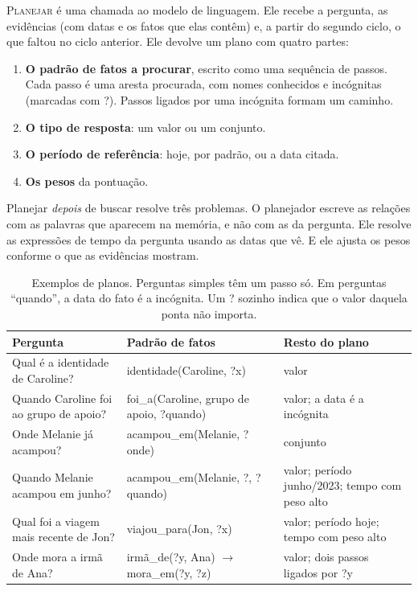 \documentclass[11pt]{article}
\newcommand{\op}[1]{\textsc{#1}}
\newcommand{\rel}[1]{\textsf{#1}}
\newcommand{\inc}[1]{\textsf{?#1}}
\begin{document}
\op{Planejar} é uma chamada ao modelo de linguagem. Ele recebe a pergunta, as
evidências (com datas e os fatos que elas contêm) e, a partir do segundo
ciclo, o que faltou no ciclo anterior. Ele devolve um plano com quatro
partes:
\begin{enumerate}[leftmargin=*,itemsep=1pt]
\item \textbf{O padrão de fatos a procurar}, escrito como uma sequência de
  passos. Cada passo é uma aresta procurada, com nomes conhecidos e incógnitas
  (marcadas com \textsf{?}). Passos ligados por uma incógnita formam um
  caminho.
\item \textbf{O tipo de resposta}: um valor ou um conjunto.
\item \textbf{O período de referência}: hoje, por padrão, ou a data citada.
\item \textbf{Os pesos} da pontuação.
\end{enumerate}

Planejar \emph{depois} de buscar resolve três problemas. O planejador escreve
as relações com as palavras que aparecem na memória, e não com as da
pergunta. Ele resolve as expressões de tempo da pergunta usando as datas que
vê. E ele ajusta os pesos conforme o que as evidências mostram.

\begin{table}[H]
\centering
\small
\begin{tabularx}{\textwidth}{@{}Y l Y@{}}
\toprule
Pergunta & Padrão de fatos & Resto do plano \\
\midrule
Qual é a identidade de Caroline? & \rel{identidade}(Caroline, \inc{x}) & valor \\
Quando Caroline foi ao grupo de apoio? & \rel{foi\_a}(Caroline, grupo de apoio, \inc{quando}) & valor; a data é a incógnita \\
Onde Melanie já acampou? & \rel{acampou\_em}(Melanie, \inc{onde}) & conjunto \\
Quando Melanie acampou em junho? & \rel{acampou\_em}(Melanie, \inc{}, \inc{quando}) & valor; período junho/2023; tempo com peso alto \\
Qual foi a viagem mais recente de Jon? & \rel{viajou\_para}(Jon, \inc{x}) & valor; período hoje; tempo com peso alto \\
Onde mora a irmã de Ana? & \rel{irmã\_de}(\inc{y}, Ana) $\to$ \rel{mora\_em}(\inc{y}, \inc{z}) & valor; dois passos ligados por \inc{y} \\
\bottomrule
\end{tabularx}
\caption{Exemplos de planos. Perguntas simples têm um passo só. Em perguntas
``quando'', a data do fato é a incógnita. Um \textsf{?} sozinho indica que o
valor daquela ponta não importa.}
\label{tab:planos}
\end{table}
\end{document}

